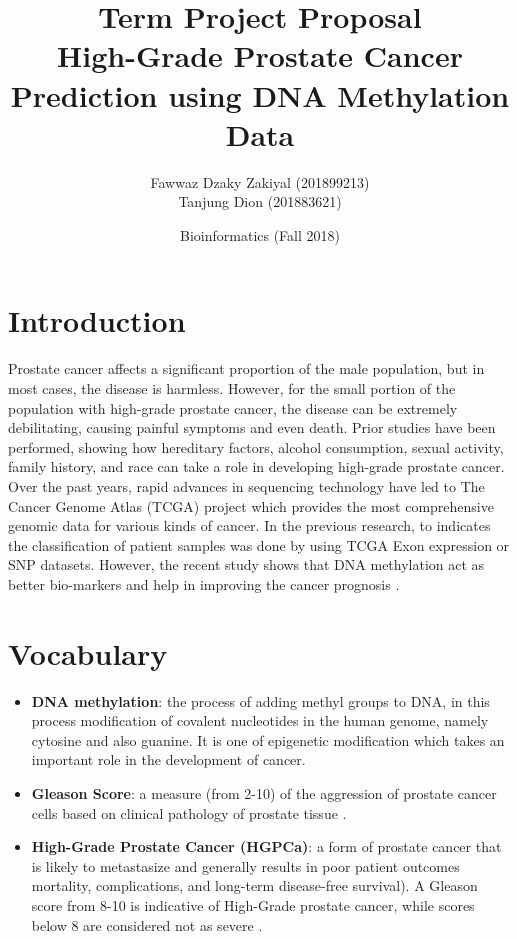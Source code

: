 \documentclass[a4paper,oneside]{article}
\begin{document}
\title{\vspace{-0.7in}Term Project Proposal\\
High-Grade Prostate Cancer Prediction using DNA Methylation Data}
\author{Fawwaz Dzaky Zakiyal (201899213)\\Tanjung Dion (201883621)\\}
\date{Bioinformatics (Fall 2018)}
\maketitle
 
\section{Introduction}
Prostate cancer affects a significant proportion of the male population, but in most cases, the disease is harmless. However, for the small portion of the population with high-grade prostate cancer, the disease can be extremely debilitating, causing painful symptoms and even death. Prior studies have been performed, showing how hereditary factors, alcohol consumption, sexual activity, family history, and race can take a role in developing high-grade prostate cancer. Over the past years, rapid advances in sequencing technology have led to The Cancer Genome Atlas (TCGA) project which provides the most comprehensive genomic data for various kinds of cancer. In the previous research, to indicates the classification of patient samples was done by using TCGA Exon expression or SNP datasets. However, the recent study shows that DNA methylation act as better bio-markers and help in improving the cancer prognosis \cite{one}.

\section{Vocabulary}
\begin{itemize}
\item \textbf{DNA methylation}: the process of adding methyl groups to DNA, in this process modification of covalent nucleotides in the human genome, namely cytosine and also guanine. It is one of epigenetic modification which takes an important role in the development of cancer.
\item \textbf{Gleason Score}: a measure (from 2-10) of the aggression of prostate cancer cells based on clinical pathology of prostate tissue \cite{four}.
\item \textbf{High-Grade Prostate Cancer (HGPCa)}: a form of prostate cancer that is likely to metastasize and generally results in poor patient outcomes mortality, complications, and long-term disease-free survival). A Gleason score from 8-10 is indicative of High-Grade prostate cancer, while scores below 8 are considered not as severe \cite{four}.
\end{itemize}
\end{document}
